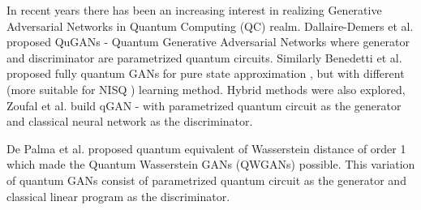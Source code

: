 In recent years there has been an increasing interest in realizing Generative
Adversarial Networks in Quantum Computing (QC) realm. Dallaire-Demers et al.
proposed QuGANs \cite{Dallaire_Demers_2018} - Quantum Generative Adversarial Networks
where generator and discriminator are parametrized quantum circuits. Similarly
Benedetti et al. proposed fully quantum GANs for pure state approximation \cite{Benedetti_2019}, but
with different (more suitable for NISQ \cite{Preskill_2018}) learning method.
Hybrid methods were also explored, Zoufal et al. build qGAN \cite{Zoufal_2019} -
with parametrized quantum circuit as the generator and classical neural network
as the discriminator. 

De Palma et al. proposed quantum equivalent of Wasserstein distance of order 1
\cite{depalma2020quantum} which made the Quantum Wasserstein GANs
(QWGANs) \cite{kiani2021quantum} possible. This variation of quantum GANs
consist of parametrized quantum circuit as the generator and classical linear
program as the discriminator.

